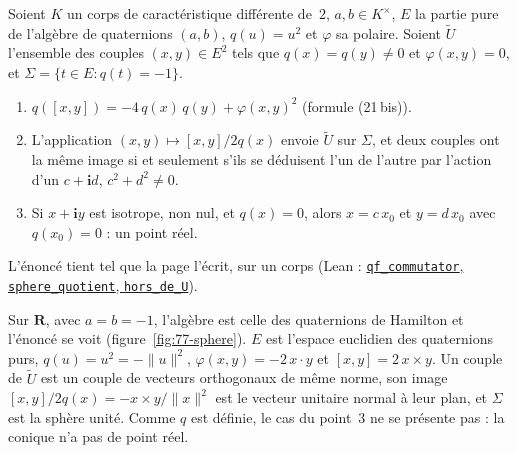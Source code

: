 \begin{encadre}
\begin{theoreme}
Soient $K$ un corps de caractéristique différente de~$2$, $a, b \in K^\times$, $E$ la partie pure de l'algèbre de quaternions $(a, b)$, $q(u) = u^2$ et $\varphi$ sa polaire. Soient $\tilde U$ l'ensemble des couples $(x, y) \in E^2$ tels que $q(x) = q(y) \neq 0$ et $\varphi(x, y) = 0$, et $\Sigma = \{t \in E : q(t) = -1\}$.
\begin{enumerate}
\item $q([x, y]) = -4\,q(x)\,q(y) + \varphi(x, y)^2$ (formule (21\,bis)).
\item L'application $(x, y) \mapsto [x, y]/2q(x)$ envoie $\tilde U$ sur $\Sigma$, et deux couples ont la même image si et seulement s'ils se déduisent l'un de l'autre par l'action d'un $c + \mathbf i d$, $c^2 + d^2 \neq 0$.
\item Si $x + \mathbf i y$ est isotrope, non nul, et $q(x) = 0$, alors $x = c\,x_0$ et $y = d\,x_0$ avec $q(x_0) = 0$ : un point réel.
\end{enumerate}
\end{theoreme}
\end{encadre}
L'énoncé tient tel que la page l'écrit, sur un corps (Lean : \href{\leanblob/RingTheory/Folder77.lean}{\texttt{qf\_commutator}, \texttt{sphere\_quotient}, \texttt{hors\_de\_U}}).


Sur $\mathbf R$, avec $a = b = -1$, l'algèbre est celle des quaternions de Hamilton et l'énoncé se voit (figure~\ref{fig:77-sphere}). $E$ est l'espace euclidien des quaternions purs, $q(u) = u^2 = -\|u\|^2$, $\varphi(x, y) = -2\,x \cdot y$ et $[x, y] = 2\,x \times y$. Un couple de $\tilde U$ est un couple de vecteurs orthogonaux de même norme, son image $[x, y]/2q(x) = -x \times y/\|x\|^2$ est le vecteur unitaire normal à leur plan, et $\Sigma$ est la sphère unité. Comme $q$ est définie, le cas du point~3 ne se présente pas : la conique n'a pas de point réel.

